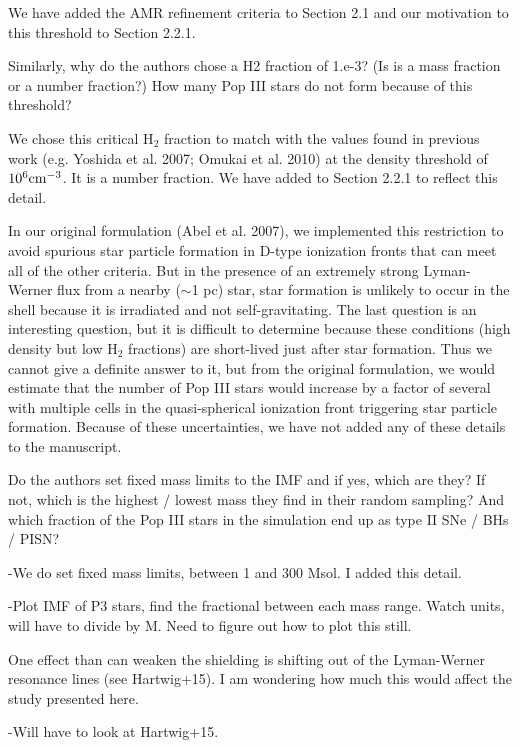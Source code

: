 \documentclass[11pt]{article}
\newenvironment{referee}[1][]{%
    \ignorespaces%
    \begin{mdframed}[style=myquotestyle,#1]%
}{%
    \end{mdframed}%
    \ignorespacesafterend%
}%
\begin{document}
We have added the AMR refinement criteria to Section 2.1 and our motivation to this threshold to Section 2.2.1.

\begin{referee}
Similarly, why do the authors chose a H2 fraction of 1.e-3? (Is is a mass fraction or a number fraction?) How many Pop III stars do not form because of this threshold?
\end{referee}

We chose this critical H$_2$ fraction to match with the values found in previous work (e.g. Yoshida et al. 2007; Omukai et al. 2010) at the density threshold of $10^6 \cubecm$.  It is a number fraction.  We have added to Section 2.2.1 to reflect this detail.

In our original formulation (Abel et al. 2007), we implemented this restriction to avoid spurious star particle formation in D-type ionization fronts that can meet all of the other criteria.  But in the presence of an extremely strong Lyman-Werner flux from a nearby ($\sim$1 pc) star, star formation is unlikely to occur in the shell because it is irradiated and not self-gravitating. The last question is an interesting question, but it is difficult to determine because these conditions (high density but low H$_2$ fractions) are short-lived just after star formation.  Thus we cannot give a definite answer to it, but from the original formulation, we would estimate that the number of Pop III stars would increase by a factor of several with multiple cells in the quasi-spherical ionization front triggering star particle formation.  Because of these uncertainties, we have not added any of these details to the manuscript.

\begin{referee}
Do the authors set fixed mass limits to the IMF and if yes, which are they?  If not, which is the highest / lowest mass they find in their random sampling?  And which fraction of the Pop III stars in the simulation end up as type II SNe / BHs / PISN?
\end{referee}
-We do set fixed mass limits, between 1 and 300 Msol. I added this detail. 

-Plot IMF of P3 stars, find the fractional between each mass range. Watch units, will have to divide by M. Need to figure out how to plot this still.

\begin{referee}
One effect than can weaken the shielding is shifting out of the Lyman-Werner resonance lines (see Hartwig+15). I am wondering how much this would affect the study presented here.
\end{referee}
-Will have to look at Hartwig+15. 
\end{document}

